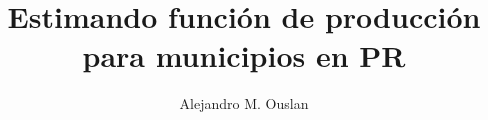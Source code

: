 \documentclass[20pt, margin=1in, innermargin=-3.5in, blockverticalspace=-0.15in]{tikzposter}
\title{Estimando función de producción para municipios en PR}
\author{Alejandro M. Ouslan}
\institute{Recinto Universitario de Mayagüez}
\begin{document}
\maketitle

\begin{columns}
	
	
	

	

	
	

	
	
	
\end{columns}
\end{document}
